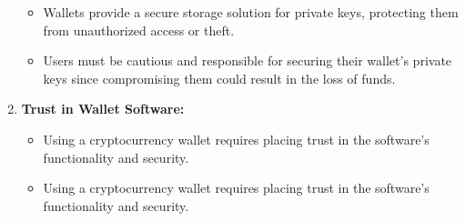 \begin{enumerate}
	\begin{itemize}
		\item Wallets provide a secure storage solution for private keys, protecting them from unauthorized access or theft.
		\item Users must be cautious and responsible for securing their wallet's private keys since compromising them could result in the loss of funds.
	\end{itemize}
	\item \textbf{Trust in Wallet Software:}
	\begin{itemize}
		\item Using a cryptocurrency wallet requires placing trust in the software's functionality and security.
		\item Using a cryptocurrency wallet requires placing trust in the software's functionality and security.
	\end{itemize}
\end{enumerate}
